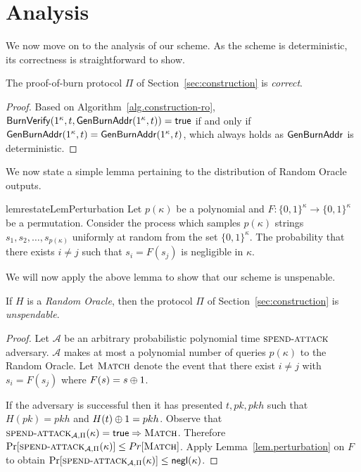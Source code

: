\section{Analysis}

We now move on to the analysis of our scheme. As the scheme is deterministic,
its correctness is straightforward to show.

\begin{theorem}[Correctness]
  The proof-of-burn protocol $\Pi$ of Section~\ref{sec:construction} is \emph{correct}.
\end{theorem}
\begin{proof}
  Based on Algorithm~\ref{alg.construction-ro}, $\mathsf{BurnVerify}(1^\kappa, t, \mathsf{Gen}\-\mathsf{Burn}\-\mathsf{Addr}(1^\kappa, t)) = \textsf{true}$ if and only if $\mathsf{Gen}\-\mathsf{Burn}\-\mathsf{Addr}(1^\kappa, t) = \mathsf{Gen}\-\mathsf{Burn}\-\mathsf{Addr}(1^\kappa, t)$, which always holds as $\mathsf{Gen}\-\mathsf{Burn}\-\mathsf{Addr}$ is deterministic.
\end{proof}

We now state a simple lemma pertaining to the distribution of Random Oracle
outputs.

\begin{restatable}[Perturbation]{lem}{restateLemPerturbation}
  \label{lem.perturbation}
  Let $p(\kappa)$ be a polynomial and
  $F: \{0,1\}^\kappa \longrightarrow \{0,1\}^\kappa$ be a permutation.
  Consider the process which samples $p(\kappa)$ strings $s_1, s_2, \dots, s_{p(\kappa)}$ uniformly at random from the set $\{0, 1\}^\kappa$. The probability that there exists $i \neq j$ such that $s_i = F(s_j)$ is negligible in $\kappa$.
\end{restatable}

We will now apply the above lemma to show that our scheme is unspenable.

\begin{theorem}[Unspendability]
  If $H$ is a \emph{Random Oracle}, then the protocol $\Pi$ of Section~\ref{sec:construction} is \emph{unspendable}.
\end{theorem}
\begin{proof}
  Let $\mathcal{A}$ be an arbitrary probabilistic polynomial time $\textsc{spend}\-\text{-}\-\textsc{attack}$ adversary.
  $\mathcal{A}$ makes at most a polynomial number of queries $p(\kappa)$ to the Random Oracle.
  Let $\textsc{Match}$ denote the event
  that there exist $i \neq j$ with $s_i = F(s_j)$ where $F(s) = s \oplus 1$.

  If the adversary is successful then it has presented $t, pk, pkh$ such that $H(pk) = pkh$ and $H(t) \oplus 1 = pkh$.
  Observe that $\textsc{spend}\-\text{-}\-\textsc{attack}_{\mathcal{A}, \Pi}(\kappa) = \mathsf{true} \Rightarrow \textsc{Match}$.
  Therefore $\Pr[\textsc{spend}\-\text{-}\-\textsc{attack}_{\mathcal{A}, \Pi}(\kappa)] \leq Pr[\textsc{Match}]$. Apply Lemma~\ref{lem.perturbation} on $F$
  to obtain
  $\Pr[\textsc{spend}\-\text{-}\-\textsc{attack}_{\mathcal{A}, \Pi}(\kappa)] \leq \textsf{negl}(\kappa)$.
\end{proof}

